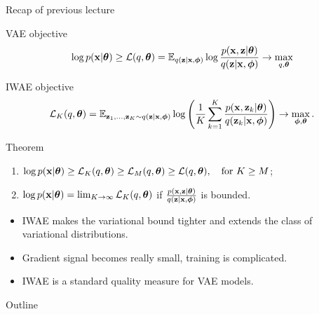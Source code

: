 \begin{frame}{Recap of previous lecture}
	\begin{block}{VAE objective}
		\vspace{-0.4cm}
		\[
			\log p(\mathbf{x} | \boldsymbol{\theta}) \geq \mathcal{L} (q, \boldsymbol{\theta})  = \mathbb{E}_{q(\mathbf{z} | \mathbf{x}, \boldsymbol{\phi})} \log \frac{p(\mathbf{x}, \mathbf{z} | \boldsymbol{\theta})}{q(\mathbf{z}| \mathbf{x}, \boldsymbol{\phi})} \rightarrow \max_{q, \boldsymbol{\theta}}
		\]
		\vspace{-0.5cm}
	\end{block}
	\begin{block}{IWAE objective}
		\vspace{-0.7cm}
		\[
		\mathcal{L}_K (q, \boldsymbol{\theta})  = \mathbb{E}_{\mathbf{z}_1, \dots, \mathbf{z}_K \sim q(\mathbf{z} | \mathbf{x}, \boldsymbol{\phi})} \log \left( \frac{1}{K}\sum_{k=1}^K\frac{p(\mathbf{x}, \mathbf{z}_k | \boldsymbol{\theta})}{q(\mathbf{z}_k| \mathbf{x}, \boldsymbol{\phi})} \right) \rightarrow \max_{\boldsymbol{\phi}, \boldsymbol{\theta}}.
		\]
		\vspace{-0.5cm}
	\end{block}
	\begin{block}{Theorem}
		\begin{enumerate}
			\item $\log p(\mathbf{x} | \boldsymbol{\theta}) \geq \mathcal{L}_K (q, \boldsymbol{\theta}) \geq \mathcal{L}_M (q, \boldsymbol{\theta}) \geq \mathcal{L} (q, \boldsymbol{\theta}), \quad \text{for } K \geq M$;
			\item $\log p(\mathbf{x} | \boldsymbol{\theta}) = \lim_{K \rightarrow \infty} \mathcal{L}_K (q, \boldsymbol{\theta})$ if $\frac{p(\mathbf{x}, \mathbf{z} | \boldsymbol{\theta})}{q(\mathbf{z} | \mathbf{x}, \boldsymbol{\phi})}$ is bounded.
		\end{enumerate}
	\end{block}
	\begin{itemize}
		\item IWAE makes the variational bound tighter and extends the class of variational distributions.
		\item Gradient signal becomes really small, training is complicated.
		\item IWAE is a standard quality measure for VAE models.
	\end{itemize}
\end{frame}
\begin{frame}{Outline}
	\tableofcontents
\end{frame}
